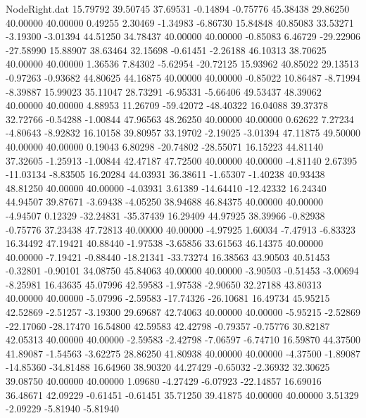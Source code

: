 \begin{filecontents}{NodeRight.dat}
  15.79792   39.50745   37.69531    -0.14894   -0.75776   45.38438   29.86250   40.00000   40.00000    0.49255    2.30469   -1.34983   -6.86730
  15.84848   40.85083   33.53271    -3.19300   -3.01394   44.51250   34.78437   40.00000   40.00000   -0.85083    6.46729  -29.22906  -27.58990
  15.88907   38.63464   32.15698    -0.61451   -2.26188   46.10313   38.70625   40.00000   40.00000    1.36536    7.84302   -5.62954  -20.72125
  15.93962   40.85022   29.13513    -0.97263   -0.93682   44.80625   44.16875   40.00000   40.00000   -0.85022   10.86487   -8.71994   -8.39887
  15.99023   35.11047   28.73291    -6.95331   -5.66406   49.53437   48.39062   40.00000   40.00000    4.88953   11.26709  -59.42072  -48.40322
  16.04088   39.37378   32.72766    -0.54288   -1.00844   47.96563   48.26250   40.00000   40.00000    0.62622    7.27234   -4.80643   -8.92832
  16.10158   39.80957   33.19702    -2.19025   -3.01394   47.11875   49.50000   40.00000   40.00000    0.19043    6.80298  -20.74802  -28.55071
  16.15223   44.81140   37.32605    -1.25913   -1.00844   42.47187   47.72500   40.00000   40.00000   -4.81140    2.67395  -11.03134   -8.83505
  16.20284   44.03931   36.38611    -1.65307   -1.40238   40.93438   48.81250   40.00000   40.00000   -4.03931    3.61389  -14.64410  -12.42332
  16.24340   44.94507   39.87671    -3.69438   -4.05250   38.94688   46.84375   40.00000   40.00000   -4.94507    0.12329  -32.24831  -35.37439
  16.29409   44.97925   38.39966    -0.82938   -0.75776   37.23438   47.72813   40.00000   40.00000   -4.97925    1.60034   -7.47913   -6.83323
  16.34492   47.19421   40.88440    -1.97538   -3.65856   33.61563   46.14375   40.00000   40.00000   -7.19421   -0.88440  -18.21341  -33.73274
  16.38563   43.90503   40.51453    -0.32801   -0.90101   34.08750   45.84063   40.00000   40.00000   -3.90503   -0.51453   -3.00694   -8.25981
  16.43635   45.07996   42.59583    -1.97538   -2.90650   32.27188   43.80313   40.00000   40.00000   -5.07996   -2.59583  -17.74326  -26.10681
  16.49734   45.95215   42.52869    -2.51257   -3.19300   29.69687   42.74063   40.00000   40.00000   -5.95215   -2.52869  -22.17060  -28.17470
  16.54800   42.59583   42.42798    -0.79357   -0.75776   30.82187   42.05313   40.00000   40.00000   -2.59583   -2.42798   -7.06597   -6.74710
  16.59870   44.37500   41.89087    -1.54563   -3.62275   28.86250   41.80938   40.00000   40.00000   -4.37500   -1.89087  -14.85360  -34.81488
  16.64960   38.90320   44.27429    -0.65032   -2.36932   32.30625   39.08750   40.00000   40.00000    1.09680   -4.27429   -6.07923  -22.14857
  16.69016   36.48671   42.09229    -0.61451   -0.61451   35.71250   39.41875   40.00000   40.00000    3.51329   -2.09229   -5.81940   -5.81940

\end{filecontents}
